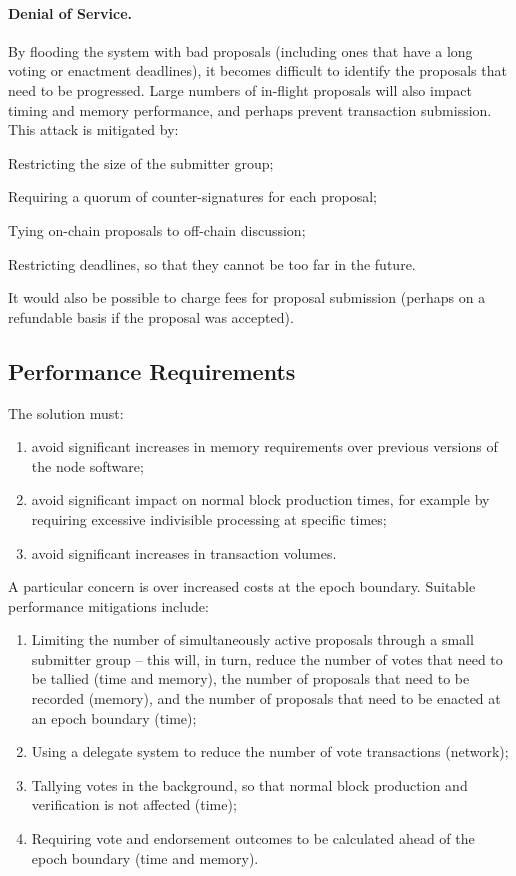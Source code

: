 \paragraph{Denial of Service.}
By flooding the system with bad proposals (including ones that have a long voting or enactment deadlines), it becomes difficult to identify the
proposals that need to be progressed.  Large numbers of in-flight proposals will also impact timing and memory performance, and perhaps prevent transaction submission.
%
This attack is mitigated by:
  \begin{inparaenum}
  \item
    Restricting the size of the submitter group;
  \item
    Requiring a quorum of counter-signatures for each proposal;
  \item
    Tying on-chain proposals to off-chain discussion;
  \item
    Restricting deadlines, so that they cannot be too far in the future.
  \end{inparaenum}
It would also be possible to charge fees for proposal submission (perhaps on a refundable basis if the proposal was accepted).

\pagebreak
\subsection{Performance Requirements}
\label{sect:performance}

The solution must:

\begin{enumerate}
\item
  avoid significant increases in memory requirements over previous versions of the node software;
\item
  avoid significant impact on normal block production times, for example by requiring excessive indivisible processing at specific times;
\item
  avoid significant increases in transaction volumes.
\end{enumerate}

A particular concern is over increased costs at the epoch boundary.
%
Suitable performance mitigations include:

\begin{enumerate}
\item
  Limiting the number of simultaneously active proposals through a small submitter group
  -- this will, in turn, reduce the number of votes that need to be tallied (time and memory),  the number of proposals that need to be recorded (memory), and the number of proposals that need to be enacted at an epoch boundary (time);
\item
  Using a delegate system to reduce the number of vote transactions (network);
\item
  Tallying votes in the background, so that normal block production and verification is not affected (time);
\item
  Requiring vote and endorsement outcomes to be calculated ahead of the epoch boundary (time and memory).
\end{enumerate}
